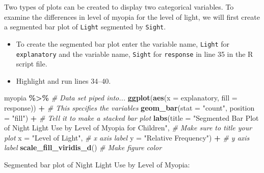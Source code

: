 \documentclass[
]{report}
\newenvironment{Shaded}{\begin{snugshade}}{\end{snugshade}}
\newcommand{\AttributeTok}[1]{\textcolor[rgb]{0.13,0.29,0.53}{#1}}
\newcommand{\CommentTok}[1]{\textcolor[rgb]{0.56,0.35,0.01}{\textit{#1}}}
\newcommand{\FunctionTok}[1]{\textcolor[rgb]{0.13,0.29,0.53}{\textbf{#1}}}
\newcommand{\NormalTok}[1]{#1}
\newcommand{\SpecialCharTok}[1]{\textcolor[rgb]{0.81,0.36,0.00}{\textbf{#1}}}
\newcommand{\StringTok}[1]{\textcolor[rgb]{0.31,0.60,0.02}{#1}}
\begin{document}
Two types of plots can be created to display two categorical variables. To examine the differences in level of myopia for the level of light, we will first create a segmented bar plot of \texttt{Light} segmented by \texttt{Sight}.

\begin{itemize}
\item
  To create the segmented bar plot enter the variable name, \texttt{Light} for \texttt{explanatory} and the variable name, \texttt{Sight} for \texttt{response} in line 35 in the R script file.
\item
  Highlight and run lines 34--40.
\end{itemize}

\begin{Shaded}
\begin{Highlighting}[]
\NormalTok{myopia }\SpecialCharTok{\%\textgreater{}\%} \CommentTok{\# Data set piped into...}
\FunctionTok{ggplot}\NormalTok{(}\FunctionTok{aes}\NormalTok{(}\AttributeTok{x =}\NormalTok{ explanatory, }\AttributeTok{fill =}\NormalTok{ response)) }\SpecialCharTok{+}   \CommentTok{\# This specifies the variables}
  \FunctionTok{geom\_bar}\NormalTok{(}\AttributeTok{stat =} \StringTok{"count"}\NormalTok{, }\AttributeTok{position =} \StringTok{"fill"}\NormalTok{) }\SpecialCharTok{+}  \CommentTok{\# Tell it to make a stacked bar plot}
  \FunctionTok{labs}\NormalTok{(}\AttributeTok{title =} \StringTok{"Segmented Bar Plot of Night Light Use by Level of }
\StringTok{       Myopia for Children"}\NormalTok{,  }\CommentTok{\# Make sure to title your plot }
       \AttributeTok{x =} \StringTok{"Level of Light"}\NormalTok{,   }\CommentTok{\# x axis label}
       \AttributeTok{y =} \StringTok{"Relative Frequency"}\NormalTok{)  }\SpecialCharTok{+} \CommentTok{\# y axis label}
  \FunctionTok{scale\_fill\_viridis\_d}\NormalTok{()  }\CommentTok{\# Make figure color}
\end{Highlighting}
\end{Shaded}

Segmented bar plot of Night Light Use by Level of Myopia:
\end{document}
